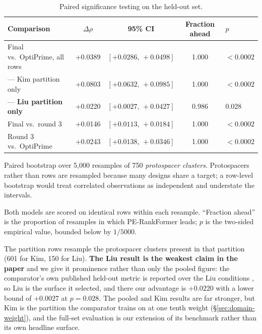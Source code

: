 \documentclass[11pt]{article}
\newcommand{\rhoS}{\rho}
\begin{document}
\begin{table}[H]
\centering
\begin{threeparttable}
\caption{Paired significance testing on the held-out set.}
\label{tab:boot}
\begin{tabular}{l S[table-format=+1.4] c S[table-format=1.3] l}
\toprule
Comparison & {$\Delta\rhoS$} & {95\% CI} & {Fraction ahead} & {$p$} \\
\midrule
Final vs.\ OptiPrime, all rows   & +0.0389 & $[+0.0286,\,+0.0498]$ & 1.000 & $<0.0002$ \\
\quad --- Kim partition only     & +0.0803 & $[+0.0632,\,+0.0985]$ & 1.000 & $<0.0002$ \\
\quad --- \textbf{Liu partition only} & +0.0220 & $[+0.0027,\,+0.0427]$ & 0.986 & 0.028 \\
Final vs.\ round 3     & +0.0146 & $[+0.0113,\,+0.0184]$ & 1.000 & $<0.0002$ \\
Round 3 vs.\ OptiPrime & +0.0243 & $[+0.0138,\,+0.0346]$ & 1.000 & $<0.0002$ \\
\bottomrule
\end{tabular}
\begin{tablenotes}[flushleft]\footnotesize
\item Paired bootstrap over 5{,}000 resamples of 750 \emph{protospacer clusters}.
Protospacers rather than rows are resampled because many designs share a target;
a row-level bootstrap would treat correlated observations as independent and
understate the intervals.
\item Both models are scored on identical rows within each resample. ``Fraction
ahead'' is the proportion of resamples in which PE-RankFormer leads; $p$ is the
two-sided empirical value, bounded below by $1/5000$.
\item The partition rows resample the protospacer clusters present in that partition
(601 for Kim, 150 for Liu). \textbf{The Liu result is the weakest claim in the paper}
and we give it prominence rather than only the pooled figure: the comparator's own
published held-out metric is reported over the Liu conditions
\citep{hsu2026}, so Liu is the surface it selected, and there our advantage is
$+0.0220$ with a lower bound of $+0.0027$ at $p=0.028$. The pooled and Kim results are
far stronger, but Kim is the partition the comparator trains on at one tenth weight
(\S\ref{sec:domain-weight}), and the full-set evaluation is our extension of its
benchmark rather than its own headline surface.
\end{tablenotes}
\end{threeparttable}
\end{table}
\end{document}
